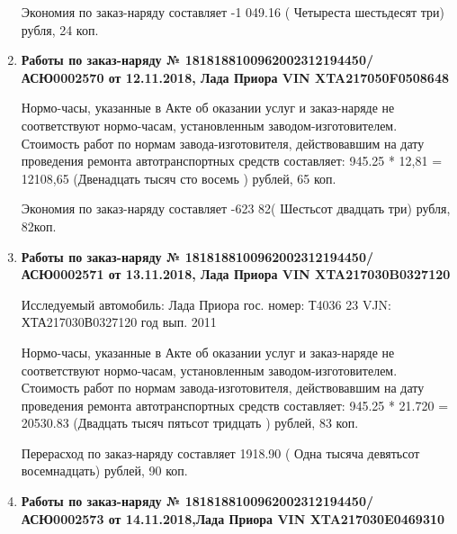 \begin{enumerate}
Экономия по заказ-наряду составляет -1 049.16 ( Четыреста шестьдесят три) рубля, 24 коп.  
\vspace{3mm}



\item \par\textbf{{Работы по заказ-наряду   № 1818188100962002312194450/\-АСЮ0002570 от 12.11.2018, Лада Приора   VIN  XTA217050F0508648
}}



Нормо-часы, указанные в Акте об оказании услуг и заказ-наряде не соответствуют нормо-часам,  установленным заводом-изготовителем.\\
Стоимость работ по нормам завода-изготовителя, действовавшим на дату проведения ремонта автотранспортных средств составляет: 945.25 * 12,81 = 12108,65 (Двенадцать тысяч сто восемь ) рублей, 65 коп.

Экономия по заказ-наряду составляет -623 82( Шестьсот двадцать три) рубля, 82коп.  
\vspace{3mm}



\item \par\textbf{{Работы по заказ-наряду    № 1818188100962002312194450/\-АСЮ0002571 от 13.11.2018, Лада Приора  VIN  XTA217030B0327120
}}

Исследуемый автомобиль:  Лада Приора гос. номер: Т4036 23 VJN: ХТА217030В0327120 год вып. 2011



Нормо-часы, указанные в Акте об оказании услуг и заказ-наряде не соответствуют нормо-часам,  установленным заводом-изготовителем.\\
Стоимость работ по нормам завода-изготовителя, действовавшим на дату проведения ремонта автотранспортных средств составляет: 945.25 * 21.720 = 20530.83 (Двадцать тысяч пятьсот тридцать ) рублей, 83 коп.

Перерасход по заказ-наряду составляет 1918.90 ( Одна тысяча девятьсот восемнадцать) рублей, 90 коп.  
\vspace{3mm}








\item \par\textbf{{Работы по заказ-наряду    № 1818188100962002312194450/\-АСЮ0002573 от 14.11.2018,Лада Приора   VIN  XTA217030E0469310
}}


\end{enumerate}
